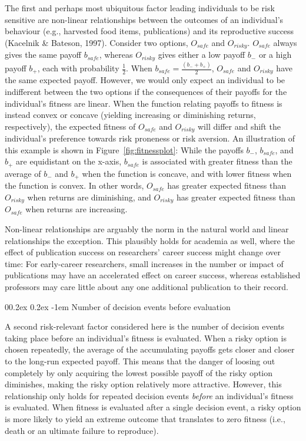 \documentclass[
  ,man,mask,floatsintext]{apa6}
\makeatletter
\let\oldparagraph\paragraph
\renewcommand{\paragraph}[1]{\oldparagraph{#1}\mbox{}}
\renewcommand{\paragraph}{\@startsection{paragraph}{4}{\parindent}%
  {0\baselineskip \@plus 0.2ex \@minus 0.2ex}%
  {-1em}%
  {\normalfont\normalsize\bfseries\itshape\typesectitle}}
\makeatother
\begin{document}
The first and perhaps most ubiquitous factor leading individuals to be risk sensitive are non-linear relationships between the outcomes of an individual's behaviour (e.g., harvested food items, publications) and its reproductive success (Kacelnik \& Bateson, 1997).
Consider two options, \(O_{safe}\) and \(O_{risky}\).
\(O_{safe}\) always gives the same payoff \(b_{safe}\), whereas \(O_{risky}\) gives either a low payoff \(b_-\) or a high payoff \(b_+\), each with probability \(\frac{1}{2}\).
When \(b_{safe} = \frac{(b_- + b_+)}{2}\), \(O_{safe}\) and \(O_{risky}\) have the same expected payoff.
However, we would only expect an individual to be indifferent between the two options if the consequences of their payoffs for the individual's fitness are linear.
When the function relating payoffs to fitness is instead convex or concave (yielding increasing or diminishing returns, respectively), the expected fitness of \(O_{safe}\) and \(O_{risky}\) will differ and shift the individual's preference towards risk proneness or risk aversion.
An illustration of this example is shown in Figure~\ref{fig:fitnessplot}:
While the payoffs \(b_-\), \(b_{safe}\), and \(b_+\) are equidistant on the x-axis, \(b_{safe}\) is associated with greater fitness than the average of \(b_-\) and \(b_+\) when the function is concave, and with lower fitness when the function is convex.
In other words, \(O_{safe}\) has greater expected fitness than \(O_{risky}\) when returns are diminishing, and \(O_{risky}\) has greater expected fitness than \(O_{safe}\) when returns are increasing.

Non-linear relationships are arguably the norm in the natural world and linear relationships the exception.
This plausibly holds for academia as well, where the effect of publication success on researchers' career success might change over time:
For early-career researchers, small increases in the number or impact of publications may have an accelerated effect on career success, whereas established professors may care little about any one additional publication to their record.

\hypertarget{number-of-decision-events-before-evaluation}{%
\paragraph{Number of decision events before evaluation}\label{number-of-decision-events-before-evaluation}}

A second risk-relevant factor considered here is the number of decision events taking place before an individual's fitness is evaluated.
When a risky option is chosen repeatedly, the average of the accumulating payoffs gets closer and closer to the long-run expected payoff.
This means that the danger of loosing out completely by only acquiring the lowest possible payoff of the risky option diminishes, making the risky option relatively more attractive.
However, this relationship only holds for repeated decision events \emph{before} an individual's fitness is evaluated.
When fitness is evaluated after a single decision event, a risky option is more likely to yield an extreme outcome that translates to zero fitness (i.e., death or an ultimate failure to reproduce).
\end{document}
